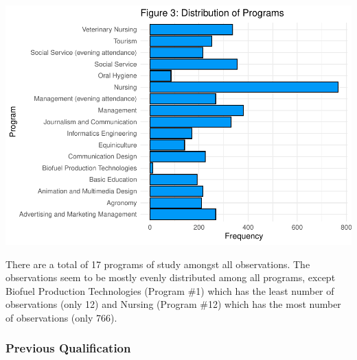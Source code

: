 \documentclass[
]{article}
\begin{document}
\begin{center}\includegraphics{finalproj_files/figure-latex/unnamed-chunk-8-1} \end{center}

There are a total of 17 programs of study amongst all observations. The
observations seem to be mostly evenly distributed among all programs,
except Biofuel Production Technologies (Program \#1) which has the least
number of observations (only 12) and Nursing (Program \#12) which has
the most number of observations (only 766).

\hypertarget{previous-qualification}{%
\subsubsection{Previous Qualification}\label{previous-qualification}}
\end{document}
